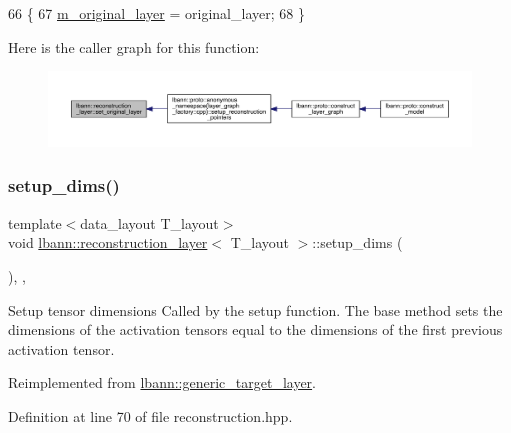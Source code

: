 \begin{DoxyCode}
66                                                  \{
67     \hyperlink{classlbann_1_1reconstruction__layer_a077a29792de2a39015da8b18120a00e3}{m\_original\_layer} = original\_layer;
68   \}
\end{DoxyCode}
Here is the caller graph for this function\+:\nopagebreak
\begin{figure}[H]
\begin{center}
\leavevmode
\includegraphics[width=350pt]{classlbann_1_1reconstruction__layer_a57e3d25871c8472c5a8de71537fdedff_icgraph}
\end{center}
\end{figure}
\mbox{\label{classlbann_1_1reconstruction__layer_a3abb27b670b5c57f2a6b1d669a7de508}} 
\subsubsection{\texorpdfstring{setup\+\_\+dims()}{setup\_dims()}}
{\footnotesize\ttfamily template$<$data\+\_\+layout T\+\_\+layout$>$ \\
void \hyperlink{classlbann_1_1reconstruction__layer}{lbann\+::reconstruction\+\_\+layer}$<$ T\+\_\+layout $>$\+::setup\+\_\+dims (\begin{DoxyParamCaption}{ }\end{DoxyParamCaption})\hspace{0.3cm}{\ttfamily [inline]}, {\ttfamily [override]}, {\ttfamily [virtual]}}

Setup tensor dimensions Called by the setup function. The base method sets the dimensions of the activation tensors equal to the dimensions of the first previous activation tensor. 

Reimplemented from \hyperlink{classlbann_1_1generic__target__layer_a3a970c1b23f7367276f7061563fc8b65}{lbann\+::generic\+\_\+target\+\_\+layer}.



Definition at line 70 of file reconstruction.\+hpp.


